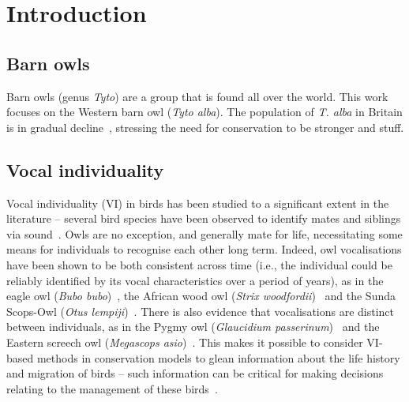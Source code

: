 \section{Introduction}
\subsection{Barn owls}
Barn owls (genus \textit{Tyto}) are a group that is found all over the world. This work focuses on the Western barn owl (\textit{Tyto alba}). The population of \textit{T. alba} in Britain is in gradual decline~\cite{keeneStudySmallMammal2009,loveChangesFoodBritish2000}, stressing the need for conservation to be stronger and stuff. 

\subsection{Vocal individuality}
Vocal individuality (VI) in birds has been studied to a significant extent in the literature -- several bird species have been observed to identify mates and siblings via sound~\cite{lindFemaleGreatTits1996,carlsonIndividualVocalRecognition2020}. Owls are no exception, and generally mate for life, necessitating some means for individuals to recognise each other long term. Indeed, owl vocalisations have been shown to be both consistent across time (i.e., the individual could be reliably identified by its vocal characteristics over a period of years), as in the eagle owl (\textit{Bubo bubo})~\cite{lengagneTEMPORALSTABILITYINDIVIDUAL2001}, the African wood owl (\textit{Strix woodfordii})~\cite{delportVocalIdentificationIndividual2002} and the Sunda Scops-Owl (\textit{Otus lempiji})~\cite{yeeVocalIndividualitySunda2016}. There is also evidence that vocalisations are distinct between individuals, as in the Pygmy owl (\textit{Glaucidium passerinum})~\cite{galeottiIndividuallyDistinctHooting1993} and the Eastern screech owl (\textit{Megascops asio})~\cite{nagyIdentificationIndividualEastern2012}. This makes it possible to consider VI-based methods in conservation models to glean information  about the life history and migration of birds -- such information can be critical for making decisions relating to the management of these birds~\cite{terryRoleVocalIndividuality2005,choiCaseStudyMale2019}.

